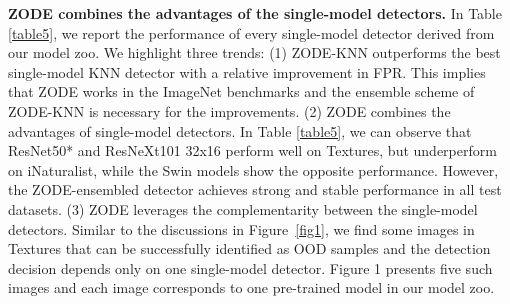 \documentclass{article} \usepackage{iclr2023_conference,times}
\begin{document}
{\bf ZODE combines the advantages of the single-model detectors.} In Table \ref{table5}, we report the performance of every single-model detector derived from our model zoo. We highlight three trends: (1) ZODE-KNN outperforms the best single-model KNN detector with a relative  improvement in FPR. 
This implies that ZODE works in the ImageNet benchmarks and the ensemble scheme of ZODE-KNN is necessary for the improvements. 
(2) ZODE combines the advantages of single-model detectors. In Table \ref{table5}, 
we can observe that ResNet50* and ResNeXt101 32x16 perform well on Textures, but underperform on iNaturalist, while the Swin models show the opposite performance. However, the ZODE-ensembled detector achieves strong and stable performance in all test datasets.
(3) ZODE leverages the complementarity between the single-model detectors.
Similar to the discussions in Figure~\ref{fig1}, we find some images in Textures that can be successfully identified as OOD samples and the detection decision depends only on one single-model detector.
Figure 1 presents five such images and each image corresponds to one pre-trained model
in our model zoo.


\begin{table}[t]
\caption{{\bf Results on ImageNet.} Comparison with single-model detectors and ZODE.  All values are percentages.  indicates smaller values are better and vice versa.}
\label{table5}
\begin{center}
\end{center}
\end{table}
\end{document}
